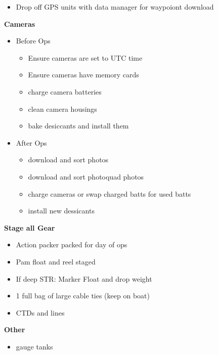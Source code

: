 \documentclass[
]{book}
\providecommand{\tightlist}{%
  \setlength{\itemsep}{0pt}\setlength{\parskip}{0pt}}
\begin{document}
\begin{itemize}
\tightlist
\item
  Drop off GPS units with data manager for waypoiont download
\end{itemize}

\textbf{Cameras}

\begin{itemize}
\tightlist
\item
  Before Ops

  \begin{itemize}
  \tightlist
  \item
    Ensure cameras are set to UTC time
  \item
    Ensure cameras have memory cards
  \item
    charge camera batteries
  \item
    clean camera housings
  \item
    bake desiccants and install them
  \end{itemize}
\item
  After Ops

  \begin{itemize}
  \tightlist
  \item
    download and sort photos
  \item
    download and sort photoquad photos
  \item
    charge cameras or swap charged batts for used batts
  \item
    install new dessicants
  \end{itemize}
\end{itemize}

\textbf{Stage all Gear}

\begin{itemize}
\tightlist
\item
  Action packer packed for day of ops
\item
  Pam float and reel staged
\item
  If deep STR: Marker Float and drop weight
\item
  1 full bag of large cable ties (keep on boat)
\item
  CTDs and lines
\end{itemize}

\textbf{Other}

\begin{itemize}
\tightlist
\item
  gauge tanks
\end{itemize}
\end{document}
